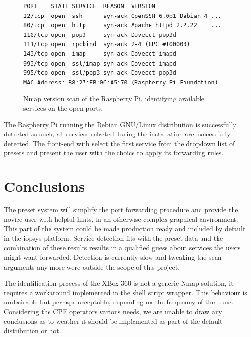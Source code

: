 \documentclass[a4paper,11pt,makeidx]{kth-bcs}
\begin{document}
   \begin{figure}[h]
      \centering
      \label{fig:rasp_scan}
      \begin{lstlisting}[escapechar=!]
PORT    STATE SERVICE  REASON  VERSION
22/tcp  open  ssh      syn-ack OpenSSH 6.0p1 Debian 4 ...
80/tcp  open  http     syn-ack Apache httpd 2.2.22    ...
110/tcp open  pop3     syn-ack Dovecot pop3d
111/tcp open  rpcbind  syn-ack 2-4 (RPC #100000)
143/tcp open  imap     syn-ack Dovecot imapd
993/tcp open  ssl/imap syn-ack Dovecot imapd
995/tcp open  ssl/pop3 syn-ack Dovecot pop3d
MAC Address: B8:27:EB:0C:A5:70 (Raspberry Pi Foundation)
\end{lstlisting}
      \caption{
         \small{
Nmap version scan of the Raspberry Pi, identifying available services on the open ports.
         }
      }
   \end{figure}
The Raspberry Pi running the Debian GNU/Linux distribution is successfully detected as such, all services selected during the installation are successfully detected.
The front-end with select the first service from the dropdown list of presets and present the user with the choice to apply its forwarding rules.

\chapter{Conclusions}

The preset system will simplify the port forwarding procedure and provide the novice user with helpful hints, in an otherwise complex graphical environment.
This part of the system could be made production ready and included by default in the iopsys platform.
Service detection fits with the preset data and the combination of these results results in a qualified guess about services the users might want forwarded.
Detection is currently slow and tweaking the scan arguments any more were outside the scope of this project.

The identification process of the XBox 360 is not a generic Nmap solution, it requires a workaround implemented in the shell script wrapper.
This behaviour is undesirable but perhaps acceptable, depending on the frequency of the issue.
Considering the CPE operators various needs, we are unable to draw any conclusions as to weather it should be implemented as part of the default distribution or not.
\end{document}
